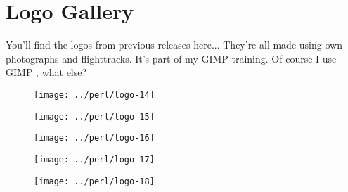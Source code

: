 
\section{Logo Gallery}
You'll find the logos from previous releases here...
They're all made using own photographs and flighttracks. It's part of my GIMP-training.
Of course I use GIMP \cite{gimp}, what else?

\begin{figure}[h]
\begin{center}
\texttt{[image: ../perl/logo-14]}
\end{center}
\end{figure}

\begin{figure}[h]
\begin{center}
\texttt{[image: ../perl/logo-15]}
\end{center}
\end{figure}

\begin{figure}[h]
\begin{center}
\texttt{[image: ../perl/logo-16]}
\end{center}
\end{figure}

\begin{figure}[h]
\begin{center}
\texttt{[image: ../perl/logo-17]}
\end{center}
\end{figure}

\begin{figure}[h]
\begin{center}
\texttt{[image: ../perl/logo-18]}
\end{center}
\end{figure}



\clearpage